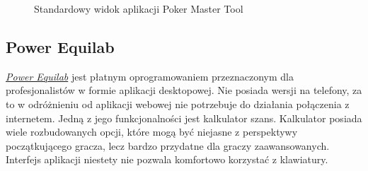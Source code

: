 \begin{figure}[!htbp]
    \caption{Standardowy widok aplikacji Poker Master Tool}
    \label{fig:poker-master-tool-view}    
\end{figure}

\subsection{Power Equilab}

\href{http://power-equilab.com/}{\emph{Power Equilab}} jest płatnym oprogramowaniem przeznaczonym dla profesjonalistów w formie aplikacji desktopowej. Nie posiada wersji na telefony, za to w odróżnieniu od aplikacji webowej nie potrzebuje do działania połączenia z internetem. Jedną z jego funkcjonalności jest kalkulator szans. Kalkulator posiada wiele rozbudowanych opcji, które mogą być niejasne z perspektywy początkującego gracza, lecz bardzo przydatne dla graczy zaawansowanych. Interfejs aplikacji niestety nie pozwala komfortowo korzystać z klawiatury. 

